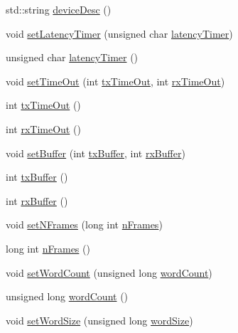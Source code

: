 \begin{DoxyCompactItemize}
\item 
std\+::string \hyperlink{classUsbFTInterface_af353796fd68a869ea5c8e753aa65dc2c}{device\+Desc} ()
\item 
void \hyperlink{classUsbFTInterface_abe0147f74ac414d0bd2cb4a7a81024b9}{set\+Latency\+Timer} (unsigned char \hyperlink{classUsbFTInterface_a4fa70ce4a4cd4f8f01cdeb4835f11276}{latency\+Timer})
\item 
unsigned char \hyperlink{classUsbFTInterface_a4fa70ce4a4cd4f8f01cdeb4835f11276}{latency\+Timer} ()
\item 
void \hyperlink{classUsbFTInterface_a62d90f80a81d1decd66f9b9f10cb8dc6}{set\+Time\+Out} (int \hyperlink{classUsbFTInterface_acab2397cb42003a1ed8f69a0c6cae195}{tx\+Time\+Out}, int \hyperlink{classUsbFTInterface_ad95ffb87539ca86882e26fa24b00de97}{rx\+Time\+Out})
\item 
int \hyperlink{classUsbFTInterface_acab2397cb42003a1ed8f69a0c6cae195}{tx\+Time\+Out} ()
\item 
int \hyperlink{classUsbFTInterface_ad95ffb87539ca86882e26fa24b00de97}{rx\+Time\+Out} ()
\item 
void \hyperlink{classUsbFTInterface_aaa09fdc28deb45d0a65f5d42c06dd659}{set\+Buffer} (int \hyperlink{classUsbFTInterface_acac73d3fc1587437656bb7fe24e10906}{tx\+Buffer}, int \hyperlink{classUsbFTInterface_a836d1a8d181fd49e11235bb677e3fa7e}{rx\+Buffer})
\item 
int \hyperlink{classUsbFTInterface_acac73d3fc1587437656bb7fe24e10906}{tx\+Buffer} ()
\item 
int \hyperlink{classUsbFTInterface_a836d1a8d181fd49e11235bb677e3fa7e}{rx\+Buffer} ()
\item 
void \hyperlink{classUsbFTInterface_a247a19741032fa0f330cc3f6c17ed08b}{set\+N\+Frames} (long int \hyperlink{classUsbFTInterface_a694f5cb1d38d4369a597ad6761762c0e}{n\+Frames})
\item 
long int \hyperlink{classUsbFTInterface_a694f5cb1d38d4369a597ad6761762c0e}{n\+Frames} ()
\item 
void \hyperlink{classUsbFTInterface_a8251b4faa76c380ea41d795482532e30}{set\+Word\+Count} (unsigned long \hyperlink{classUsbFTInterface_a2acaf55e8c253f20e1f25a023c9238f4}{word\+Count})
\item 
unsigned long \hyperlink{classUsbFTInterface_a2acaf55e8c253f20e1f25a023c9238f4}{word\+Count} ()
\item 
void \hyperlink{classUsbFTInterface_a1666f09d2b8994f8d13d6bc66f43b530}{set\+Word\+Size} (unsigned long \hyperlink{classUsbFTInterface_add098ede127a2089e3ac8ea615ed6d46}{word\+Size})

\end{DoxyCompactItemize}
